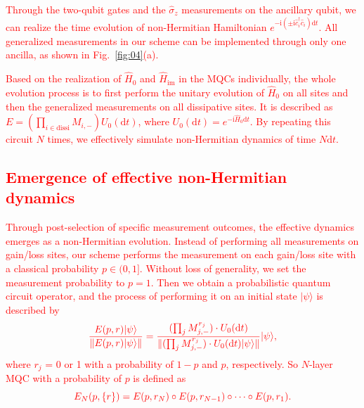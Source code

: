 \documentclass[longbibliography, aps, prx, amsmath, amssymb, amsfonts, twocolumn,superscriptaddress, footinbib]{revtex4-1}
\begin{document}
	\textcolor{red}{Through the two-qubit gates and the $\hat{\sigma}_z$ measurements on the ancillary qubit, we can realize the time evolution of non-Hermitian Hamiltonian $e^{-\mathrm{i} (\pm \mathrm{i} \hat{c}_i^{\dagger}\hat{c}_i) \mathrm{d}t}$. All generalized measurements in our scheme can be implemented through only one ancilla, as shown in Fig.~\ref{fig:04}(a).}
	
	\textcolor{red}{Based on the realization of $\hat{H}_0$ and $\hat{H}_{\text{im}}$ in the MQCs individually, the whole evolution process is to first perform the unitary evolution of $\hat{H}_0$ on all sites and then the generalized measurements on all dissipative sites. It is described as $E=(\prod_{i\in \text{dissi}} M_{i,-}) U_{0}(\mathrm{d} t)$, where $U_{0}(\mathrm{d}t)=e^{-\mathrm{i}\hat{H}_0 \mathrm{d}t}$. By repeating this circuit $N$ times, we effectively simulate non-Hermitian dynamics of time $N\mathrm{d}t$.}
	
	\subsection{\textcolor{red}{Emergence of effective non-Hermitian dynamics}}
	\label{sec:effective_dynamics}
	
	\textcolor{red}{Through post-selection of specific measurement outcomes, the effective dynamics emerges as a non-Hermitian evolution.} \textcolor{red}{Instead of performing all measurements on gain/loss sites, our scheme performs the measurement on each gain/loss site with a classical probability $p\in(0,1]$. Without loss of generality, we set the measurement probability to $p=1$. Then we obtain a probabilistic quantum circuit operator, and the process of performing it on an initial state $\vert \psi \rangle$ is described by}
	\begin{equation}
		\textcolor{red}{\frac{E(p,r) \vert \psi \rangle}{\Vert E(p,r) \vert \psi \rangle \Vert} = \frac{(\prod_j M_{j,-}^{r_j}) \cdot U_0(\mathrm{d}t)}{\Vert (\prod_j M_{j,-}^{r_j}) \cdot U_0(\mathrm{d}t) \vert \psi \rangle \Vert} \vert \psi \rangle,}
	\end{equation}
	\textcolor{red}{where $r_j$ = 0 or 1 with a probability of $1-p$ and $p$, respectively. So $N$-layer MQC with a probability of $p$ is defined as}
	\begin{equation}
		\textcolor{red}{E_N(p,\{r\}) = E(p, r_N) \circ E(p, r_{N-1}) \circ \cdots \circ E(p, r_1).}
	\end{equation}
	
\end{document}
